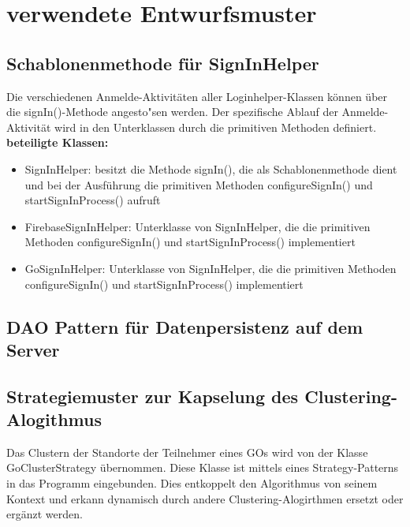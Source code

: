 \documentclass[11pt,a4paper]{report}
\begin{document}
\section{verwendete Entwurfsmuster}

\subsection{Schablonenmethode für SignInHelper}
Die verschiedenen Anmelde-Aktivitäten aller Loginhelper-Klassen können über die signIn()-Methode angesto"sen werden. Der spezifische Ablauf der Anmelde-Aktivität wird in den Unterklassen durch die primitiven Methoden definiert. \\

\textbf{beteiligte Klassen:}
\begin{itemize}
	\item SignInHelper: besitzt die Methode signIn(), die als Schablonenmethode dient und bei der Ausführung die primitiven Methoden configureSignIn() und startSignInProcess() aufruft
	\item FirebaseSignInHelper: Unterklasse von SignInHelper, die die primitiven Methoden configureSignIn() und startSignInProcess() implementiert
	\item GoSignInHelper: Unterklasse von SignInHelper, die die primitiven Methoden configureSignIn() und startSignInProcess() implementiert
\end{itemize}

\subsection{DAO Pattern für Datenpersistenz auf dem Server}

\subsection{Strategiemuster zur Kapselung des Clustering-Alogithmus}
Das Clustern der Standorte der Teilnehmer eines GOs wird von der Klasse GoClusterStrategy übernommen. Diese Klasse ist mittels eines Strategy-Patterns in das Programm eingebunden. Dies entkoppelt den Algorithmus von seinem Kontext und erkann dynamisch durch andere Clustering-Alogirthmen ersetzt oder ergänzt werden. \\
\end{document}
